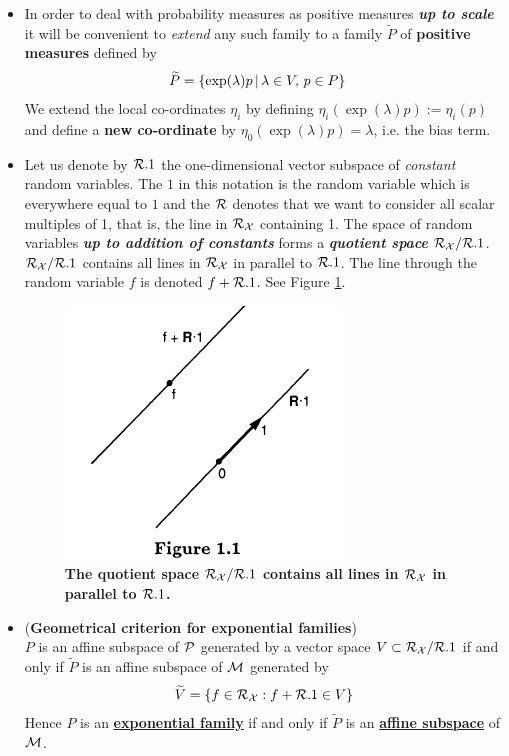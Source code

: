 \documentclass[11pt]{article}
\begin{document}
\begin{itemize}
\item In order to deal with probability measures as positive measures \emph{\textbf{up to scale}} it will be convenient to \emph{extend} any such family to a family $\widetilde{P}$ of \textbf{positive measures} defined by
\begin{align*}
\widetilde{P} &=\left\{\exp(\lambda)p \,|\, \lambda \in V,\, p \in P\right\}
\end{align*} We extend the local co-ordinates $\eta_i$ by defining $\eta_i(\exp(\lambda)p) := \eta_i(p)$ and define a \textbf{new co-ordinate} by $\eta_0(\exp(\lambda)p) = \lambda$, i.e. the bias term. 
 
 \item Let us denote by ${\mathcal R}.1$ the one-dimensional vector subspace of \emph{constant} random variables.  The $1$ in this notation is the random
variable which is everywhere equal to $1$ and the ${\mathcal R}$ denotes that we want to consider all scalar multiples of 1, that is, the line in ${\mathcal R}_{{\mathcal X}}$ containing 1. The space of random variables \emph{\textbf{up to addition of constants}} forms a \emph{\textbf{quotient space}} ${\mathcal R}_{{\mathcal X}}/{\mathcal R}.1$.  ${\mathcal R}_{{\mathcal X}}/{\mathcal R}.1$ contains all lines in ${\mathcal R}_{{\mathcal X}}$ in parallel to ${\mathcal R}.1$. The line through the random variable $f$ is denoted $f+ {\mathcal R}.1$. See Figure \ref{fig: geo_exp_fam}.

\begin{figure}
\begin{minipage}[t]{1\linewidth}
  \centering
  \centerline{\includegraphics[scale = 0.5]{geo_exp_fam.png}}
\end{minipage}
\caption{\footnotesize{\textbf{The quotient space ${\mathcal R}_{{\mathcal X}}/{\mathcal R}.1$ contains all lines in ${\mathcal R}_{{\mathcal X}}$ in parallel to ${\mathcal R}.1$. \citep{murray1993differential}}}}
\label{fig: geo_exp_fam}
\end{figure}


\item  \begin{proposition} (\textbf{Geometrical criterion for exponential families}) \citep{murray1993differential}\\
$P$ is an affine subspace of ${\mathcal P}$ generated by a vector space $V \subset {\mathcal R}_{{\mathcal X}}/{\mathcal R}.1$ if and only if $\widetilde{P}$ is an affine subspace of ${\mathcal M}$ generated by
\begin{align*}
\widetilde{V} = \left\{f \in {\mathcal R}_{{\mathcal X}}: f+ {\mathcal R}.1 \in V\right\}
\end{align*} Hence $P$ is an \underline{\textbf{exponential family}} if and only if $\widetilde{P}$ is an \underline{\textbf{affine subspace}} of ${\mathcal M}$.
 \end{proposition}
 

\end{itemize}
\end{document}
